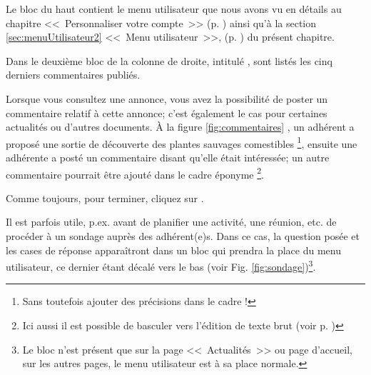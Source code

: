 Le bloc du haut contient le menu utilisateur que nous avons vu en détails au chapitre <<~Personnaliser votre compte~>> (p. \pageref{chap:personnaliserCompte}) ainsi qu'à la section \ref{sec:menuUtilisateur2} <<~Menu utilisateur~>>, (p. \pageref{sec:menuUtilisateur2}) du présent chapitre.


Dans le deuxième bloc de la colonne de droite, intitulé , sont listés les cinq derniers commentaires publiés.

Lorsque vous consultez une annonce, vous avez la possibilité de poster un commentaire relatif à cette annonce; c’est également le cas pour certaines actualités ou d’autres documents. À la figure \ref{fig:commentaires} , un adhérent a proposé une sortie de découverte des plantes sauvages comestibles%
\footnote{Sans toutefois ajouter des précisions dans le cadre !},
ensuite une adhérente a posté un commentaire disant qu'elle était intéressée; un autre commentaire pourrait être ajouté dans le cadre éponyme %
\footnote{Ici aussi il est possible de basculer vers l'édition de texte brut (voir p. \pageref{page:editeurTexteBrut})}.

Comme toujours, pour terminer, cliquez  sur .



 
 Il est parfois utile, p.ex. avant de planifier une activité, une réunion, etc. de procéder à un sondage auprès des adhérent(e)s. Dans ce cas, la question posée et les cases de réponse apparaîtront dans un bloc qui prendra la place du menu utilisateur, ce dernier étant décalé vers le bas (voir Fig. \ref{fig:sondage})\footnote{Le bloc  n'est présent que sur la page <<~Actualités~>> ou page d'accueil, sur les autres pages, le menu utilisateur est à sa place normale.}.

